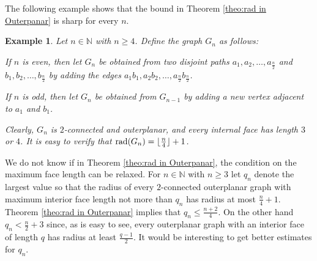 \documentclass[a4paper,11pt]{article}
\newtheorem{example}{Example}[section]
\numberwithin{equation}{theorem}
\begin{document}
The following example shows that the bound in Theorem \ref{theo:rad in Outerpanar} is sharp 
for every $n$.

\begin{example}{\rm 
Let $n \in \mathbb{N}$ with $n\geq 4$. Define the graph $G_n$ as follows: 
 
If $n$ is even, then let $G_n$ be obtained from 
two disjoint paths $a_1,a_2,\ldots,a_{\frac{n}{2}}$ and $b_1, b_2,\ldots,b_{\frac{n}{2}}$ by adding the edges $a_1b_1, a_2b_2,\ldots,a_{\frac{n}{2}}b_{\frac{n}{2}}$.

If $n$ is odd, then let $G_n$ be obtained from $G_{n-1}$ by adding a new vertex adjacent to $a_1$ and $b_1$. 

Clearly, $G_n$ is $2$-connected and outerplanar, and every internal face has length $3$ or $4$. It is easy to verify that ${\rm rad}(G_n) = \lfloor \frac{n}{4} \rfloor +1$.}
\end{example}


We do not know if in Theorem \ref{theo:rad in Outerpanar}, the condition on the maximum
face length can be relaxed. For $n\in \mathbb{N}$ with $n\geq 3$ let $q_n$ denote the 
largest value so that the radius of every $2$-connected outerplanar graph with maximum 
interior face length not more than $q_n$ has radius at most $\frac{n}{4}+1$. 
Theorem \ref{theo:rad in Outerpanar} implies that $q_n \leq \frac{n+2}{4}$. On the other
hand $q_n < \frac{n}{2}+3$ since, as is easy to see, every outerplanar graph with an 
interior face of length $q$ has radius at least $\frac{q-1}{2}$.
It would be interesting to get better estimates for $q_n$.   
\end{document}
